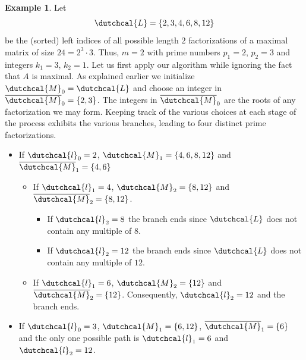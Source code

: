 \documentclass{article}
\numberwithin{equation}{section}
\newcommand{\lcal}{\dutchcal{l}}
\theoremstyle{definition}
\newtheorem{example}[definition]{Example}
\begin{document}
\begin{example}
\label{ex: max_mat_24}
Let
\begin{equation*}
    \dutchcal{L}=\{2,3,4,6,8,12\}
\end{equation*}
be the (sorted) left indices of all possible length $2$ factorizations of a maximal matrix of size $24=2^3 \cdot 3$. Thus, $m=2$ with prime numbers $p_1=2$, $p_2=3$ and integers $k_1=3$, $k_2=1$. Let us first apply our algorithm while ignoring the fact that $A$ is maximal. As explained earlier we initialize $\dutchcal{M}_0=\dutchcal{L}$ and choose an integer in $\overline{\dutchcal{M}}_0=\{2,3\}$. The integers in $\overline{\dutchcal{M}}_0$ are the roots of any factorization we may form. Keeping track of the various choices at each stage of the process exhibits the various branches, leading to four distinct prime factorizations.
\begin{itemize}
    \item If $\lcal_0=2$, $\dutchcal{M}_1 = \{4,6,8,12\}$ and $\overline{\dutchcal{M}}_1 = \{4,6\}$
    \begin{itemize}
        \item If $\lcal_1=4$, $\dutchcal{M}_2=\{8,12\}$ and $\overline{\dutchcal{M}}_2=\{8,12\}$.
        \begin{itemize}
            \item If $\lcal_2=8$ the branch ends since $\dutchcal{L}$ does not contain any multiple of $8$.
            \item If $\lcal_2=12$ the branch ends since $\dutchcal{L}$ does not contain any multiple of $12$.
        \end{itemize}
        \item If $\lcal_1=6$, $\dutchcal{M}_2=\{12\}$ and $\overline{\dutchcal{M}}_2=\{12\}$. Consequently, $\lcal_2=12$ and the branch ends.
    \end{itemize}
    \item If $\lcal_0=3$, $\dutchcal{M}_1 = \{6,12\}$, $\overline{\dutchcal{M}}_1 = \{6\}$ and the only one possible path is $\lcal_1=6$ and $\lcal_2=12$.
\end{itemize}


\end{example}
\end{document}
